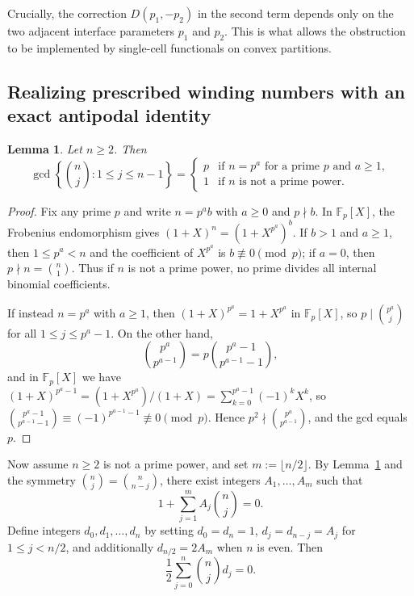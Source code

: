 \documentclass[11pt,a4paper]{amsart}
\numberwithin{equation}{section}
\newtheorem{lemma}[theorem]{Lemma}
\theoremstyle{definition}
\newcommand{\F}{\mathbb{F}}
\begin{document}
Crucially, the correction $D(p_1, -p_2)$ in the second term depends only on the two adjacent interface parameters $p_1$ and $p_2$. This is what allows the obstruction to be implemented by single-cell functionals on convex partitions.

\subsection{Realizing prescribed winding numbers with an exact antipodal identity}

\begin{lemma}
\label{lem:binom-gcd}
Let $n \ge 2$. Then
\[
\gcd\left\{\binom{n}{j} : 1 \le j \le n-1\right\} =
\begin{cases}
p & \text{if } n = p^a \text{ for a prime } p \text{ and } a \ge 1, \\
1 & \text{if } n \text{ is not a prime power.}
\end{cases}
\]
\end{lemma}

\begin{proof}
Fix any prime $p$ and write $n = p^a b$ with $a \ge 0$ and $p \nmid b$. In $\F_p[X]$, the Frobenius endomorphism gives $(1+X)^n = (1+X^{p^a})^b$. If $b > 1$ and $a \ge 1$, then $1 \le p^a < n$ and the coefficient of $X^{p^a}$ is $b \not\equiv 0 \pmod{p}$; if $a = 0$, then $p \nmid n = \binom{n}{1}$. Thus if $n$ is not a prime power, no prime divides all internal binomial coefficients.

If instead $n = p^a$ with $a \ge 1$, then $(1+X)^{p^a} = 1 + X^{p^a}$ in $\F_p[X]$, so $p \mid \binom{p^a}{j}$ for all $1 \le j \le p^a - 1$. On the other hand,
\[
\binom{p^a}{p^{a-1}} = p \binom{p^a - 1}{p^{a-1} - 1},
\]
and in $\F_p[X]$ we have $(1+X)^{p^a - 1} = (1+X^{p^a})/(1+X) = \sum_{k=0}^{p^a-1} (-1)^k X^k$, so $\binom{p^a-1}{p^{a-1}-1} \equiv (-1)^{p^{a-1}-1} \not\equiv 0 \pmod{p}$. Hence $p^2 \nmid \binom{p^a}{p^{a-1}}$, and the gcd equals $p$.
\end{proof}

Now assume $n \ge 2$ is not a prime power, and set $m := \lfloor n/2 \rfloor$. By Lemma~\ref{lem:binom-gcd} and the symmetry $\binom{n}{j} = \binom{n}{n-j}$, there exist integers $A_1, \dots, A_m$ such that
\[
1 + \sum_{j=1}^m A_j \binom{n}{j} = 0.
\]
Define integers $d_0, d_1, \dots, d_n$ by setting $d_0 = d_n = 1$, $d_j = d_{n-j} = A_j$ for $1 \le j < n/2$, and additionally $d_{n/2} = 2 A_m$ when $n$ is even. Then
\begin{equation}
\label{eq:winding-sum-zero}
\frac{1}{2} \sum_{j=0}^n \binom{n}{j} d_j = 0.
\end{equation}
\end{document}
